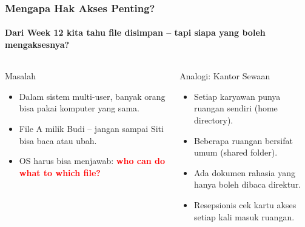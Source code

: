 \documentclass[t,aspectratio=169,xcolor=dvipsnames]{beamer}
\newcommand{\tem}[1]{\textbf{\textcolor{red}{#1}}}
\begin{document}
\begin{frame}
    \frametitle{Mengapa Hak Akses Penting?}
    \framesubtitle{Dari Week 12 kita tahu file disimpan -- tapi siapa yang boleh mengaksesnya?}

    \begin{columns}[T]
        \begin{block}{Masalah}
            \small
            \begin{itemize}
                \item Dalam sistem multi-user, banyak orang bisa pakai komputer yang sama.
                \item File A milik Budi -- jangan sampai Siti bisa baca atau ubah.
                \item OS harus bisa menjawab: \tem{who can do what to which file?}
            \end{itemize}
        \end{block}

        \begin{exampleblock}{Analogi: Kantor Sewaan}
            \small
            \begin{itemize}
                \item Setiap karyawan punya ruangan sendiri (home directory).
                \item Beberapa ruangan bersifat umum (shared folder).
                \item Ada dokumen rahasia yang hanya boleh dibaca direktur.
                \item Resepsionis cek kartu akses setiap kali masuk ruangan.
            \end{itemize}
        \end{exampleblock}
    \end{columns}
\end{frame}
\end{document}
